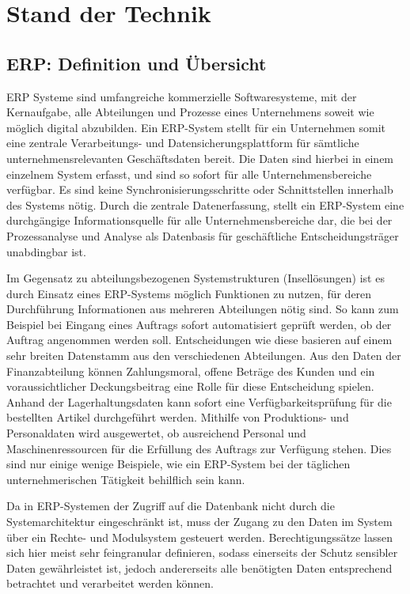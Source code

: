 \chapter{Stand der Technik}
\label{cha:Stand der Technik}

\section{ERP: Definition und Übersicht}
\label{sec:ERP: Definition und Übersicht}
ERP Systeme sind umfangreiche kommerzielle Softwaresysteme, mit der Kernaufgabe, alle Abteilungen und Prozesse eines Unternehmens soweit wie möglich digital abzubilden\cite{doi:10.1002/smr.239}. Ein ERP-System stellt für ein Unternehmen somit eine zentrale Verarbeitungs- und Datensicherungsplattform für sämtliche unternehmensrelevanten Geschäftsdaten bereit. Die Daten sind hierbei in einem einzelnem System erfasst, und sind so sofort für alle Unternehmensbereiche verfügbar. Es sind keine Synchronisierungsschritte oder Schnittstellen innerhalb des Systems nötig. Durch die zentrale Datenerfassung, stellt ein ERP-System eine durchgängige Informationsquelle für alle Unternehmensbereiche dar, die bei der Prozessanalyse und Analyse als Datenbasis für geschäftliche Entscheidungsträger unabdingbar ist.

Im Gegensatz zu abteilungsbezogenen Systemstrukturen (Insellösungen) ist es durch Einsatz eines ERP-Systems möglich Funktionen zu nutzen, für deren Durchführung Informationen aus mehreren Abteilungen nötig sind\cite{DynamicsNAV2018Anwenderbuch}. So kann zum Beispiel bei Eingang eines Auftrags sofort automatisiert geprüft werden, ob der Auftrag angenommen werden soll. Entscheidungen wie diese basieren auf einem sehr breiten Datenstamm aus den verschiedenen Abteilungen. Aus den Daten der Finanzabteilung können Zahlungsmoral, offene Beträge des Kunden und ein voraussichtlicher Deckungsbeitrag eine Rolle für diese Entscheidung spielen. Anhand der Lagerhaltungsdaten kann sofort eine Verfügbarkeitsprüfung für die bestellten Artikel durchgeführt werden. Mithilfe von Produktions- und Personaldaten wird ausgewertet, ob ausreichend Personal und Maschinenressourcen für die Erfüllung des Auftrags zur Verfügung stehen. Dies sind nur einige wenige Beispiele, wie ein ERP-System bei der täglichen unternehmerischen Tätigkeit behilflich sein kann.

Da in ERP-Systemen der Zugriff auf die Datenbank nicht durch die Systemarchitektur eingeschränkt ist, muss der Zugang zu den Daten im System über ein Rechte- und Modulsystem gesteuert werden\cite{DynamicsNAV2018Anwenderbuch}. Berechtigungssätze lassen sich hier meist sehr feingranular definieren, sodass einerseits der Schutz sensibler Daten gewährleistet ist, jedoch andererseits alle benötigten Daten entsprechend betrachtet und verarbeitet werden können.

